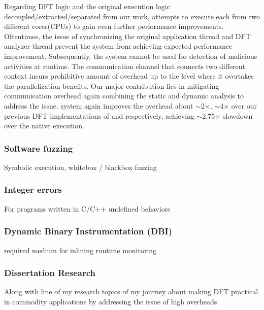 \documentclass[letterpaper, 10pt]{article}
\begin{document}
\begin{small}
Regarding DFT logic and the original execution logic
decoupled/extracted/separated from our \TFA work, \SR attempts to execute each
from two different cores(CPUs) to gain even further performance improvements.
Oftentimes, the issue of synchronizing the original application thread and DFT
analyzer thread prevent the system from achieving expected performance
improvement. Subsequently, the system cannot be used for detection of malicious
activities at runtime.
%
The communication channel that connects two different context incurs
prohibitive amount of overhead up to the level where it overtakes the
parallelization benefits. Our major contribution lies in mitigating
communication overhead again combining the static and dynamic analysis to
address the issue.
%
\SR system again improves the overhead about  $\sim$2$\times$,  $\sim$4$\times$
over our previous DFT implementations of \TFA and \libdft respectively,
achieving  $\sim$2.75$\times$ slowdown over the native execution. 


\subsubsection*{Software fuzzing}
Symbolic execution, whitebox / blackbox fuzzing

\subsubsection*{Integer errors}
For programs written in C/C++ undefined behaviors

\subsubsection*{Dynamic Binary Instrumentation (DBI)}
required medium for inlining runtime monitoring 

\subsubsection*{Dissertation Research}
Along with line of my research topics of my journey about making DFT practical
in commodity applications by addressing the issue of high overheads.



\end{small}
\end{document}

